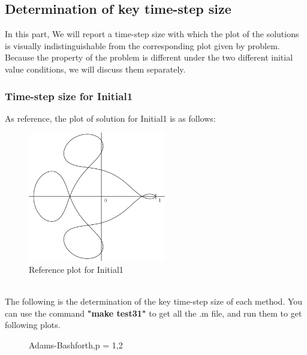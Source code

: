 \documentclass[a4paper,twocolumn]{article}
\theoremstyle{definition}
\begin{document}
\subsection{Determination of key time-step size}
In this part, We will report a time-step size with which the plot of the solutions is visually indistinguishable from the corresponding plot given by problem. Because the property of the problem is different under the two different initial value conditions, we will discuss them separately.
\subsubsection{Time-step size for Initial1}
As reference, the plot of solution for Initial1 is as follows:\\
\begin{figure}[!htp]   
	\centering
	\includegraphics[width=6cm]{Pictures/I1.png}
	\caption{Reference plot for Initial1}
	\label{fig:R1}
\end{figure}\\
\noindent The following is the determination of the key time-step size of each method. You can use the command \textbf{"make test31"} to get all the .m file, and run them to get following plots.
\newpage
\begin{figure}[!htp] 
	\centering
	\caption{Adams-Bashforth,p = 1,2 }
	\label{AB1ks}
\end{figure}
\end{document}
